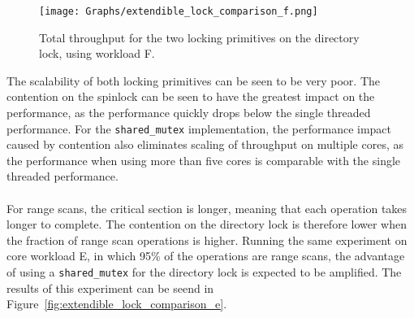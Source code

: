 \documentclass[11pt]{report} %
\begin{document}
\begin{figure}[H]
  \centering
  \texttt{[image: Graphs/extendible\_lock\_comparison\_f.png]}\\
  \caption{Total throughput for the two locking primitives on the directory lock, using workload F.}\label{fig:extendible_lock_comparison}
\end{figure}
\noindent
The scalability of both locking primitives can be seen to be very poor. The contention on the spinlock can be seen to have the greatest impact on the performance, as the performance quickly drops below the single threaded performance. For the \verb|shared_mutex| implementation, the performance impact caused by contention also eliminates scaling of throughput on multiple cores, as the performance when using more than five cores is comparable with the single threaded performance.\\
\\
For range scans, the critical section is longer, meaning that each operation takes longer to complete. The contention on the directory lock is therefore lower when the fraction of range scan operations is higher. Running the same experiment on core workload E, in which 95\% of the operations are range scans, the advantage of using a \verb|shared_mutex| for the directory lock is expected to be amplified. The results of this experiment can be seend in Figure~\ref{fig:extendible_lock_comparison_e}.
\end{document}
